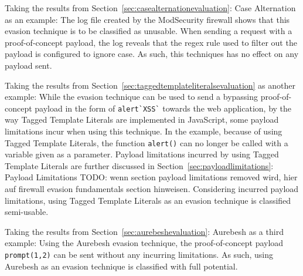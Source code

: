 Taking the results from Section~\ref{sec:casealternationevaluation}: Case Alternation as an example: The log file created by the ModSecurity firewall shows that this evasion technique is to be classified as unusable. When sending a request with a proof-of-concept payload, the log reveals that the regex rule used to filter out the payload is configured to ignore case. As such, this techniques has no effect on any payload sent.

Taking the results from Section~\ref{sec:taggedtemplateliteralsevaluation} as another example: While the evasion technique can be used to send a bypassing proof-of-concept payload in the form of \verb|alert`XSS`| towards the web application, by the way Tagged Template Literals are implemented in JavaScript, some payload limitations incur when using this technique. In the example, because of using Tagged Template Literals, the function \verb|alert()| can no longer be called with a variable given as a parameter. Payload limitations incurred by using Tagged Template Literals are further discussed in Section~\ref{sec:payloadlimitations}: Payload Limitations {\color{red}TODO: wenn section payload limitations removed wird, hier auf firewall evasion fundamentals section hinweisen}. Considering incurred payload limitations, using Tagged Template Literals as an evasion technique is classified semi-usable.

Taking the results from Section~\ref{sec:aurebeshevaluation}: Aurebesh as a third example: Using the Aurebesh evasion technique, the proof-of-concept payload \verb|prompt(1,2)| can be sent without any incurring limitations. As such, using Aurebesh as an evasion technique is classified with full potential.

